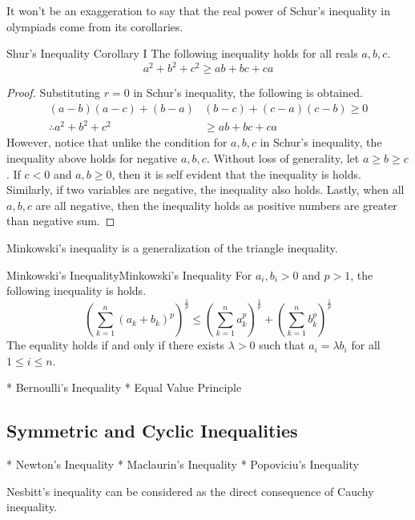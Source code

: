 \documentclass[../../../main.tex]{subfiles}
\begin{document}
It won't be an exaggeration to say that the real power of Schur's
inequality in olympiads come from its corollaries.

\begin{corollary}{}{Shur's Inequality Corollary I}
The following inequality holds for all reals $a, b, c$.
\[
a^2 + b^2 + c^2 \geq ab + bc + ca
\]
\end{corollary}
\begin{proof}
Substituting $r = 0$ in Schur's inequality, the following is obtained.
\begin{align*}
    (a - b)(a - c) + (b - a)&(b - c) + (c - a)(c - b)
    \geq 0 \\
    \therefore a^2 + b^2 + c^2
    &\geq ab + bc + ca
\end{align*}
However, notice that unlike the condition for $a, b, c$ in Schur's
inequality, the inequality above holds for negative $a, b, c$.
Without loss of generality, let $a \geq b \geq c$. If $c < 0$ and
$a, b \geq 0$, then it is self evident that the inequality is holds.
Similarly, if two variables are negative, the inequality also holds.
Lastly, when all $a, b, c$ are all negative, then the inequality
holds as positive numbers are greater than negative sum.
\end{proof}






Minkowski's inequality is a generalization of the triangle inequality.

\begin{theorem}{Minkowski's Inequality}{Minkowski's Inequality}
For $a_i, b_i > 0$ and $p > 1$, the following inequality is holds.
\[
\left( \sum_{k = 1}^n (a_k + b_k)^p \right)^\frac{1}{p}
\leq
\left( \sum_{k = 1}^n a_k^p \right)^\frac{1}{p}
    + \left( \sum_{k = 1}^n b_k^p \right)^\frac{1}{p}
\]
The equality holds if and only if there exists $\lambda > 0$ such that
$a_i = \lambda b_i$ for all $1 \leq i \leq n$.
\end{theorem}


* Bernoulli’s Inequality
* Equal Value Principle

\subsection{Symmetric and Cyclic Inequalities}
* Newton's Inequality
* Maclaurin's Inequality
* Popoviciu's Inequality

Nesbitt's inequality can be considered as the direct consequence
of Cauchy inequality.
\end{document}

